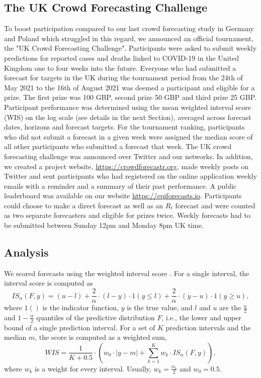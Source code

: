 \documentclass[10pt,a4paper,twocolumn]{article}
\begin{document}
\subsection*{The UK Crowd Forecasting Challenge}

To boost participation compared to our last crowd forecasting study in Germany and Poland \citep{bosseComparingHumanModelbased2022} which struggled in this regard, we announced an official tournament, the "UK Crowd Forecasting Challenge". Participants were asked to submit weekly predictions for reported cases and deaths linked to COVID-19 in the United Kingdom one to four weeks into the future. Everyone who had submitted a forecast for targets in the UK during the tournament period from the 24th of May 2021 to the 16th of August 2021 was deemed a participant and eligible for a prize. The first prize was 100 GBP, second prize 50 GBP and third prize 25 GBP. Participant performance was determined using the mean weighted interval score (WIS) on the log scale (see details in the next Section), %
averaged across forecast dates, horizons and forecast targets. For the tournament ranking, participants who did not submit a forecast in a given week were assigned the median score of all other participants who submitted a forecast that week. The UK crowd forecasting challenge was announced over Twitter and our networks. 
In addition, we created a project website, \url{https://crowdforecastr.org}, made weekly posts on Twitter and sent participants who had registered on the online application weekly emails with a reminder and a summary of their past performance. A public leaderboard was available on our website \url{https://epiforecasts.io}. Participants could choose to make a direct forecast as well as an $R_t$ forecast and were counted as two separate forecasters and eligible for prizes twice. Weekly forecasts had to be submitted between Sunday 12pm and Monday 8pm UK time. 


\subsection*{Analysis}
\label{sec:analysis}

We scored forecasts using the weighted interval score
\cite{bracherEvaluatingEpidemicForecasts2021}. For a single interval, the interval score is computed as 
  $$IS_\alpha(F,y) = (u-l) + \frac{2}{\alpha} \cdot (l-y) \cdot 1(y \leq l) + \frac{2}{\alpha} \cdot (y-u) \cdot 1(y \geq u), $$ 
  where $1()$ is the indicator function, $y$ is the true value, and $l$ and $u$ are the $\frac{\alpha}{2}$ and $1 - \frac{\alpha}{2}$ quantiles of the predictive distribution $F$, i.e., the lower and upper bound of a single prediction interval. For a set of $K$ prediction intervals and the median $m$, the score is computed as a weighted sum, 
  $$WIS = \frac{1}{K + 0.5} \cdot \left( w_0 \cdot |y - m| + \sum_{k = 1}^{K} w_k \cdot IS_{\alpha}(F, y) \right), $$
  where $w_k$ is a weight for every interval. Usually, $w_k = \frac{\alpha_k}{2}$ and $w_0 = 0.5$. 
\end{document}
